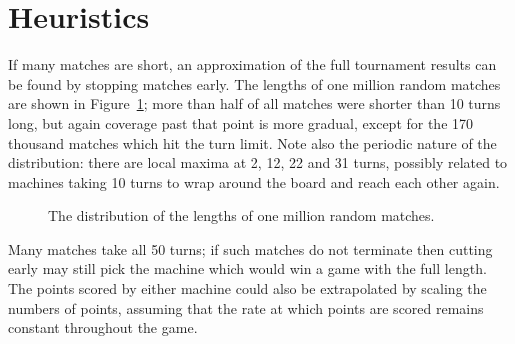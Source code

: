 \section{Heuristics}

If many matches are short, an approximation of the full tournament
results can be found by stopping matches early. The lengths of one million
random matches are shown in Figure~\ref{fig:turn-distribution}; more than half
of all matches were shorter than 10 turns long, but again coverage past that point
is more gradual, except for the 170 thousand matches which hit the turn limit.
Note also the periodic nature of the distribution: there are local maxima at 2, 12,
22 and 31 turns, possibly related to machines taking 10 turns to wrap around the
board and reach each other again.

\begin{figure}
  \begin{subfigure}[b]{0.5\textwidth}
    \centering
  \end{subfigure}%
  \begin{subfigure}[b]{0.5\textwidth}
    \centering
  \end{subfigure}
  \caption{The distribution of the lengths of one million random matches.}
  \label{fig:turn-distribution}
\end{figure}

Many matches take all 50 turns; if such matches do not terminate
then cutting early may still pick the machine which would win a game
with the full length. The points scored by either machine could also be
extrapolated by scaling the numbers of points, assuming that the rate
at which points are scored remains constant throughout the game.